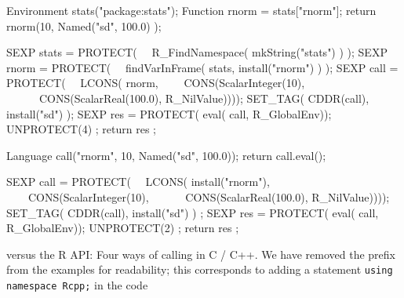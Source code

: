 \begin{table*}[t]
  \begin{minipage}[t]{0.465\linewidth}
    \begin{example}
Environment stats("package:stats");
Function rnorm = stats["rnorm"];
return rnorm(10, Named("sd", 100.0) );
    \end{example}
  \end{minipage}
  \begin{minipage}{0.06\linewidth}
    \phantom{XXX}
  \end{minipage}
  \begin{minipage}[t]{0.465\linewidth}
    \begin{example}
SEXP stats = PROTECT( 
\ \ R_FindNamespace( mkString("stats") ) );
SEXP rnorm = PROTECT( 
\ \ findVarInFrame( stats, install("rnorm") ) );
SEXP call  = PROTECT( 
\ \ LCONS( rnorm, 
\ \ \ \ CONS(ScalarInteger(10), 
\ \ \ \ \ \ CONS(ScalarReal(100.0), R_NilValue))));
SET_TAG( CDDR(call), install("sd") );
SEXP res = PROTECT( eval( call, R_GlobalEnv));
UNPROTECT(4) ;
return res ;
    \end{example}
  \end{minipage}


  \begin{minipage}[t]{0.465\linewidth}
    \begin{example}
Language call("rnorm", 10, Named("sd", 100.0));
return call.eval();
    \end{example}
  \end{minipage}
  \begin{minipage}{0.06\linewidth}
    \phantom{XXX}
  \end{minipage}
  \begin{minipage}[t]{0.465\linewidth}
    \begin{example}
SEXP call  = PROTECT( 
\ \ LCONS( install("rnorm"), 
\ \ \ \ CONS(ScalarInteger(10), 
\ \ \ \ \ \ CONS(ScalarReal(100.0), R_NilValue))));
SET_TAG( CDDR(call), install("sd") ) ;
SEXP res = PROTECT( eval( call, R_GlobalEnv));
UNPROTECT(2) ;
return res ;
    \end{example}
  \end{minipage}
  \caption{ versus the R API: Four ways of calling  in C / C++. 
  We have removed the  prefix from the
  examples for readability; this corresponds to adding a statement
  \texttt{using namespace Rcpp;} in the code}
  \label{fig:rnormCode}
\end{table*}

